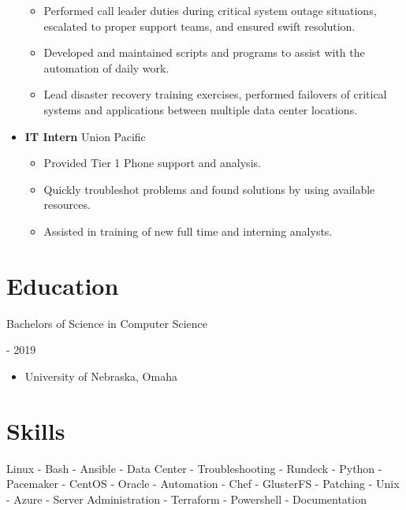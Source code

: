 \documentclass[10pt, a4paper]{article}
\begin{document}
\begin{itemize}
\begin{itemize}
        \item Performed call leader duties during critical system outage situations, escalated to proper support teams, and ensured swift resolution.
        \item Developed and maintained scripts and programs to assist with the automation of daily work.
        \item Lead disaster recovery training exercises, performed failovers of critical systems and applications between multiple data center locations.
    \end{itemize}
    \item \textbf{IT Intern} Union Pacific
    \begin{itemize}
        \item Provided Tier 1 Phone support and analysis.
        \item Quickly troubleshot problems and found solutions by using available resources.
        \item Assisted in training of new full time and interning analysts.
    \end{itemize}
\end{itemize}
\section*{Education}
    \begin{minipage}{0.5\textwidth} %
        \raggedright %
        Bachelors of Science in Computer Science
      \end{minipage}
      \begin{minipage}{0.5\textwidth} %
         \-- 2019
      \end{minipage}
      \begin{itemize}
      \item University of Nebraska, Omaha
    \end{itemize}

\section*{Skills}
Linux - Bash - Ansible - Data Center - Troubleshooting - Rundeck - Python - Pacemaker - CentOS - Oracle - Automation - Chef - GlusterFS - Patching - Unix - Azure - Server Administration - Terraform - Powershell - Documentation
\end{document}
